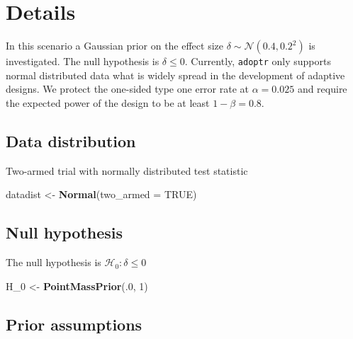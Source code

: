 \documentclass[]{book}
\newenvironment{Shaded}{\begin{snugshade}}{\end{snugshade}}
\newcommand{\DataTypeTok}[1]{\textcolor[rgb]{0.13,0.29,0.53}{#1}}
\newcommand{\DecValTok}[1]{\textcolor[rgb]{0.00,0.00,0.81}{#1}}
\newcommand{\KeywordTok}[1]{\textcolor[rgb]{0.13,0.29,0.53}{\textbf{#1}}}
\newcommand{\NormalTok}[1]{#1}
\newcommand{\OtherTok}[1]{\textcolor[rgb]{0.56,0.35,0.01}{#1}}
\newcommand{\StringTok}[1]{\textcolor[rgb]{0.31,0.60,0.02}{#1}}
\begin{document}
\hypertarget{details-1}{%
\section{Details}\label{details-1}}

In this scenario a Gaussian prior on the effect size
\(\delta \sim \mathcal{N} ( 0.4, 0.2^2)\) is investigated.
The null hypothesis is \(\delta \leq 0\).
Currently, \texttt{adoptr} only supports normal distributed data what is widely
spread in the development of adaptive designs.
We protect the one-sided type one error rate at \(\alpha = 0.025\) and require
the expected power of the design to be at least \(1 - \beta = 0.8\).

\hypertarget{data-distribution-1}{%
\subsection{Data distribution}\label{data-distribution-1}}

Two-armed trial with normally distributed test statistic

\begin{Shaded}
\begin{Highlighting}[]
\NormalTok{datadist <-}\StringTok{ }\KeywordTok{Normal}\NormalTok{(}\DataTypeTok{two_armed =} \OtherTok{TRUE}\NormalTok{)}
\end{Highlighting}
\end{Shaded}

\hypertarget{null-hypothesis-1}{%
\subsection{Null hypothesis}\label{null-hypothesis-1}}

The null hypothesis is \(\mathcal{H}_0:\delta \leq 0\)

\begin{Shaded}
\begin{Highlighting}[]
\NormalTok{H_}\DecValTok{0}\NormalTok{ <-}\StringTok{ }\KeywordTok{PointMassPrior}\NormalTok{(.}\DecValTok{0}\NormalTok{, }\DecValTok{1}\NormalTok{)}
\end{Highlighting}
\end{Shaded}

\hypertarget{prior-assumptions-1}{%
\subsection{Prior assumptions}\label{prior-assumptions-1}}
\end{document}
